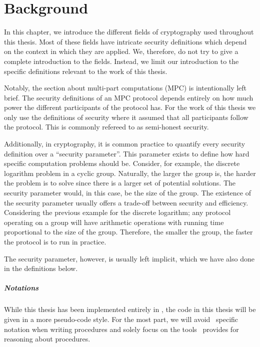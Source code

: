 \chapter{Background}
\label{ch:background}
In this chapter, we introduce the different fields of cryptography used
throughout this thesis.
Most of these fields have intricate security definitions which depend on the
context in which they are applied.
We, therefore, do not try to give a complete introduction to the fields.
Instead, we limit our introduction to the specific definitions relevant to the work of this thesis.

Notably, the section about multi-part computations (MPC) is intentionally left
brief.
The security definitions of an MPC protocol depends entirely on how much power
the different participants of the protocol has. For the work of this thesis we
only use the definitions of security where it assumed that all participants
follow the protocol. This is commonly refereed to as semi-honest security.

Additionally, in cryptography, it is common practice to quantify every security
definition over a ``security parameter''. This parameter exists to define how
hard specific computation problems should be. Consider, for example, the discrete
logarithm problem in a cyclic group. Naturally, the larger the group is,
the harder the problem is to solve since there is a larger set of potential solutions. The
security parameter would, in this case, be the size of the group.
The existence of the security parameter usually offers a trade-off between
security and efficiency. Considering the previous example for the discrete
logarithm; any protocol operating on a group will have arithmetic operations
with running time proportional to the size of the group. Therefore, the smaller
the group, the faster the protocol is to run in practice.

The security parameter, however, is usually left implicit, which we have also
done in the definitions below.

\paragraph{Notations}
While this thesis has been implemented entirely in \easycrypt, the code in this
thesis will be given in a more pseudo-code style. For
the most part, we will avoid \easycrypt\ specific notation when writing procedures
and solely focus on the tools \easycrypt\ provides for reasoning about procedures.

